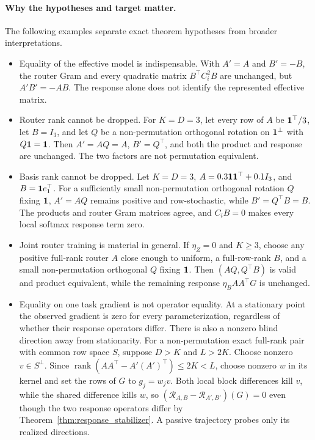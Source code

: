 \paragraph{Why the hypotheses and target matter.}
The following examples separate exact theorem hypotheses from broader
interpretations.
\begin{itemize}
 \item Equality of the effective model is indispensable.  With \(A'=A\) and
 \(B'=-B\), the router Gram and every quadratic matrix
 \(B^\top C_i^2B\) are unchanged, but \(A'B'=-AB\).  The response alone does
 not identify the represented effective matrix.

 \item Router rank cannot be dropped.  For \(K=D=3\), let every row of
 \(A\) be \(\mathbf{1}^\top/3\), let \(B=I_3\), and let \(Q\) be a
 non-permutation orthogonal rotation on \(\mathbf{1}^\perp\) with
 \(Q\mathbf{1}=\mathbf{1}\).  Then \(A'=AQ=A\), \(B'=Q^\top\), and both the product
 and response are unchanged.  The two factors are not permutation
 equivalent.

 \item Basis rank cannot be dropped.  Let
 \(K=D=3\),
 \(A=0.3\mathbf{1}\mathbf{1}^\top+0.1I_3\), and
 \(B=\mathbf{1} e_1^\top\).  For a sufficiently small non-permutation orthogonal
 rotation \(Q\) fixing \(\mathbf{1}\), \(A'=AQ\) remains positive and
 row-stochastic, while \(B'=Q^\top B=B\).  The products and router Gram
 matrices agree, and \(C_iB=0\) makes every local softmax response term zero.

 \item Joint router training is material in general.  If \(\eta_Z=0\) and
 \(K\ge3\), choose any
 positive full-rank router \(A\) close enough to uniform, a full-row-rank
 \(B\), and a small non-permutation orthogonal \(Q\) fixing \(\mathbf{1}\).
 Then \((AQ,Q^\top B)\) is valid and product equivalent, while the remaining
 response \(\eta_BAA^\top G\) is unchanged.

 \item Equality on one task gradient is not operator equality.  At a
 stationary point the observed gradient is zero for every parameterization,
 regardless of whether their response operators differ.  There is also a
 nonzero blind direction away from stationarity.  For a non-permutation exact
 full-rank pair with common row space $S$, suppose $D>K$ and $L>2K$.
 Choose nonzero $v\in S^\perp$.  Since
 $\operatorname{rank}(AA^\top-A'(A')^\top)\le2K<L$, choose nonzero
 $w$ in its kernel and set the rows of $G$ to $g_j=w_jv$.  Both local
 block differences kill $v$, while the shared difference kills $w$, so
 $(\mathcal R_{A,B}-\mathcal R_{A',B'})(G)=0$ even though the two response
 operators differ by Theorem~\ref{thm:response_stabilizer}.  A passive
 trajectory probes only its realized directions.


\end{itemize}
